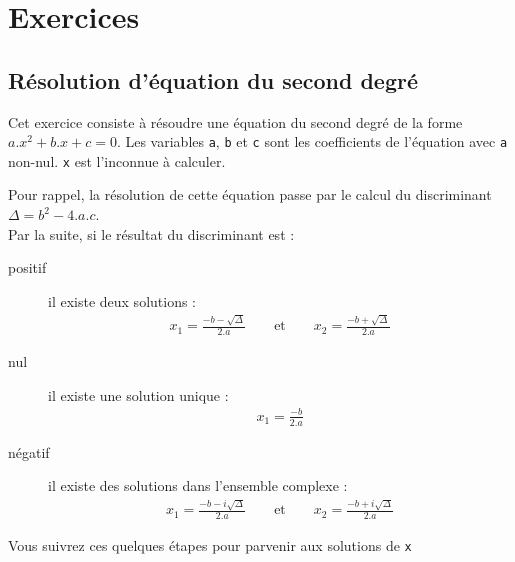 
\section{Exercices}

\subsection{Résolution d'équation du second degré}

Cet exercice consiste à résoudre une équation du second degré de la forme
$a.x^2+b.x+c = 0$.
Les variables \texttt{a}, \texttt{b} et \texttt{c} sont les coefficients de l'équation
avec \texttt{a} non-nul. \texttt{x} est l'inconnue à calculer.

Pour rappel, la résolution de cette équation passe par le calcul du discriminant
$\Delta = b^2-4.a.c$.\\
Par la suite, si le résultat du discriminant est :
\begin{description}
\item[positif] il existe deux solutions :
\begin{eqnarray*}
  x_1 = \frac{-b-\sqrt{\Delta}}{2.a} \qquad \textrm{et} \qquad x_2=\frac{-b+\sqrt{\Delta}}{2.a}
\end{eqnarray*}
\item[nul] il existe une solution unique :
\begin{eqnarray*}
  x_1 = \frac{-b}{2.a}
\end{eqnarray*}
\item[négatif] il existe des solutions dans l'ensemble complexe :
\begin{eqnarray*}
  x_1 = \frac{-b-i\sqrt{\Delta}}{2.a} \qquad \textrm{et} \qquad x_2=\frac{-b+i\sqrt{\Delta}}{2.a}
\end{eqnarray*}
\end{description}

Vous suivrez ces quelques étapes pour parvenir aux solutions de \texttt{x}


